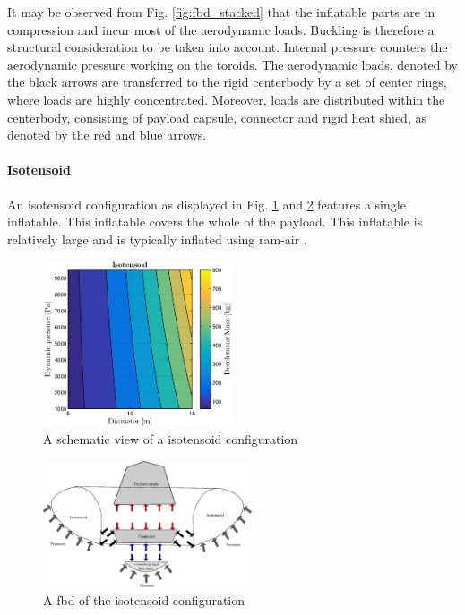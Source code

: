 It may be observed from Fig. \ref{fig:fbd_stacked} that the inflatable parts are in compression and incur most of the aerodynamic loads. Buckling is therefore a structural consideration to be taken into account. Internal pressure counters the aerodynamic pressure working on the toroids. The aerodynamic loads, denoted by the black arrows are transferred to the rigid centerbody by a set of center rings, where loads are highly concentrated. Moreover, loads are distributed within the centerbody, consisting of payload capsule, connector and rigid heat shied, as denoted by the red and blue arrows.


\paragraph{Isotensoid}

An isotensoid configuration as displayed in Fig. \ref{fig:conc_iso} and \ref{fig:fbd_iso} features a single inflatable. This inflatable covers the whole of the payload. This inflatable is relatively large and is typically inflated using ram-air \cite{Smith2011}. 

\begin{figure}[H]
\centering
\includegraphics[width = 0.5\textwidth]{Figure/ISO_comp.eps}
\caption{A schematic view of a isotensoid configuration}
\label{fig:conc_iso}
\end{figure}

\begin{figure}[H]
\centering
\includegraphics[width = 0.55\textwidth]{Figure/FBD_isotensoid.eps}
\caption{A \gls{fbd} of the isotensoid configuration}
\label{fig:fbd_iso}
\end{figure}

